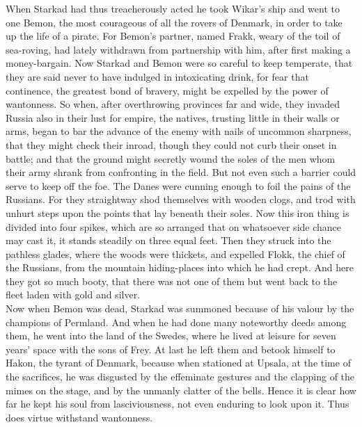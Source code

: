 \documentclass[10pt,a4paper]{report}
\begin{document}
When Starkad had thus treacherously acted he took Wikar's ship and went to one Bemon, the most courageous of all the rovers of Denmark, in order to take up the life of a pirate. For Bemon's partner, named Frakk, weary of the toil of sea-roving, had lately withdrawn from partnership with him, after first making a money-bargain. Now Starkad and Bemon were so careful to keep temperate, that they are said never to have indulged in intoxicating drink, for fear that continence, the greatest bond of bravery, might be expelled by the power of wantonness. So when, after overthrowing provinces far and wide, they invaded Russia also in their lust for empire, the natives, trusting little in their walls or arms, began to bar the advance of the enemy with nails of uncommon sharpness, that they might check their inroad, though they could not curb their onset in battle; and that the ground might secretly wound the soles of the men whom their army shrank from confronting in the field. But not even such a barrier could serve to keep off the foe. The Danes were cunning enough to foil the pains of the Russians. For they straightway shod themselves with wooden clogs, and trod with unhurt steps upon the points that lay beneath their soles. Now this iron thing is divided into four spikes, which are so arranged that on whatsoever side chance may cast it, it stands steadily on three equal feet. Then they struck into the pathless glades, where the woods were thickets, and expelled Flokk, the chief of the Russians, from the mountain hiding-places into which he had crept. And here they got so much booty, that there was not one of them but went back to the fleet laden with gold and silver.\\

Now when Bemon was dead, Starkad was summoned because of his valour by the champions of Permland. And when he had done many noteworthy deeds among them, he went into the land of the Swedes, where he lived at leisure for seven years' space with the sons of Frey. At last he left them and betook himself to Hakon, the tyrant of Denmark, because when stationed at Upsala, at the time of the sacrifices, he was disgusted by the effeminate gestures and the clapping of the mimes on the stage, and by the unmanly clatter of the bells. Hence it is clear how far he kept his soul from lasciviousness, not even enduring to look upon it. Thus does virtue withstand wantonness.\\
\end{document}
